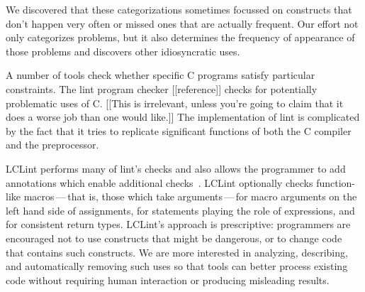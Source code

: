 \documentclass[10pt]{article}
\begin{document}
We discovered that these categorizations sometimes focussed on constructs
that don't happen very often or missed ones that are actually frequent.
Our effort not only categorizes problems, but it also determines the
frequency of appearance of those problems and discovers other idiosyncratic
uses.

A number of tools check whether specific C programs satisfy particular
constraints.  The lint program checker [[reference]]
checks for potentially problematic uses of C\@.  
[[This is irrelevant, unless you're going to claim that it does a worse job
than one would like.]]
The implementation of lint
is complicated by the fact that it tries to replicate significant functions
of both the C compiler and the preprocessor.

LCLint performs many of lint's checks and also
allows the programmer to add annotations which enable additional
checks~\cite{Evans-pldi96,Evans-fse94}.
LCLint optionally checks function-like
macros\,---\,that is, those which take arguments\,---\,for
macro arguments on the left hand side of assignments, for statements
playing the role of expressions, and for consistent return types.
LCLint's approach is prescriptive: programmers are encouraged not to use
constructs that might be dangerous, or to change code that contains such
constructs.  We are more interested in analyzing, describing, and
automatically removing such uses so that tools can better process existing
code without requiring human interaction or producing misleading results.
\end{document}
